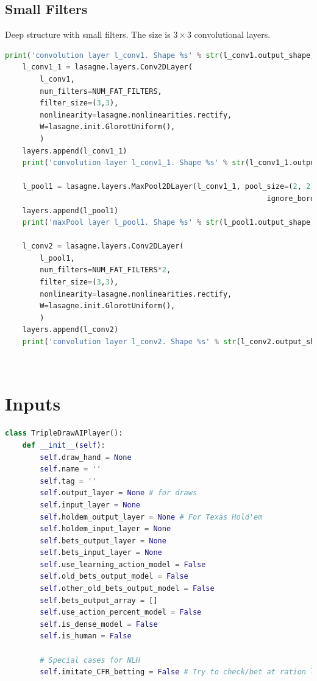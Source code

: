 \documentclass[review]{elsarticle}
\begin{document}
\subsection*{Small Filters}

Deep structure with small filters. The size is $3 \times 3 $ convolutional layers. 

\begin{lstlisting}[language=Python, caption=Small Filter Encoding]
    print('convolution layer l_conv1. Shape %s' % str(l_conv1.output_shape))
    l_conv1_1 = lasagne.layers.Conv2DLayer(
        l_conv1,
        num_filters=NUM_FAT_FILTERS,
        filter_size=(3,3),
        nonlinearity=lasagne.nonlinearities.rectify,
        W=lasagne.init.GlorotUniform(),
        )
    layers.append(l_conv1_1)
    print('convolution layer l_conv1_1. Shape %s' % str(l_conv1_1.output_shape))

    l_pool1 = lasagne.layers.MaxPool2DLayer(l_conv1_1, pool_size=(2, 2), 
                                                            ignore_border=False)
    layers.append(l_pool1)
    print('maxPool layer l_pool1. Shape %s' % str(l_pool1.output_shape))

    l_conv2 = lasagne.layers.Conv2DLayer(
        l_pool1,
        num_filters=NUM_FAT_FILTERS*2, 
        filter_size=(3,3),
        nonlinearity=lasagne.nonlinearities.rectify,
        W=lasagne.init.GlorotUniform(),
        )
    layers.append(l_conv2)
    print('convolution layer l_conv2. Shape %s' % str(l_conv2.output_shape))
\end{lstlisting}
~\cite{moscow25}\\

\section{Inputs}

\begin{lstlisting}[language=Python, caption=Inputs to CNN]
class TripleDrawAIPlayer():
    def __init__(self):
        self.draw_hand = None
        self.name = '' 
        self.tag = '' 
        self.output_layer = None # for draws
        self.input_layer = None
        self.holdem_output_layer = None # For Texas Hold'em 
        self.holdem_input_layer = None
        self.bets_output_layer = None 
        self.bets_input_layer = None
        self.use_learning_action_model = False 
        self.old_bets_output_model = False 
        self.other_old_bets_output_model = False 
        self.bets_output_array = [] 
        self.use_action_percent_model = False 
        self.is_dense_model = False 
        self.is_human = False

        # Special cases for NLH
        self.imitate_CFR_betting = False # Try to check/bet at ration learned from CFR training??
\end{lstlisting}
~\cite{moscow25}\\
\end{document}
